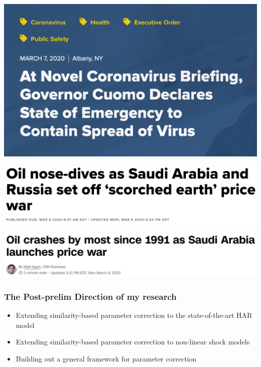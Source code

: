 \documentclass[9pt]{beamer}
\theoremstyle{definition}
\begin{document}
\begin{frame}

    \begin{example}
        \href{https://www.governor.ny.gov/news/novel-coronavirus-briefing-governor-cuomo-declares-state-emergency-contain-spread-virus}{\includegraphics[scale=.3]{NYS_state.png}}

        \href{https://www.cnbc.com/2020/03/08/opec-deal-collapse-sparks-price-war-20-oil-in-2020-is-coming.html}{\includegraphics[scale=.3]{cnn.png}}

        \href{https://www.cnn.com/2020/03/08/investing/oil-prices-crash-opec-russia-saudi-arabia/index.html}{\includegraphics[scale=.3]{cnbc.png}}
        \end{example}

\end{frame}

\begin{frame}
    \frametitle{The Post-prelim Direction of my research}
    
    \begin{itemize}
        \item Extending similarity-based parameter correction to the state-of-the-art HAR model 
        \item Extending similarity-based parameter correction to non-linear shock models
        \item Building out a general framework for parameter correction 
    \end{itemize}
\end{frame}
\end{document}
